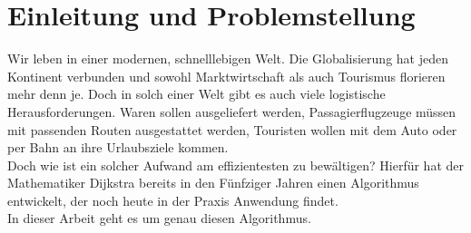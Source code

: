 \chapter{Einleitung und Problemstellung}

Wir leben in einer modernen, schnelllebigen Welt. Die Globalisierung hat jeden Kontinent verbunden und sowohl Marktwirtschaft als auch Tourismus florieren mehr denn je. 
Doch in solch einer Welt gibt es auch viele logistische Herausforderungen. Waren sollen ausgeliefert werden, Passagierflugzeuge müssen mit passenden Routen ausgestattet werden, Touristen wollen mit dem Auto oder per Bahn an ihre Urlaubsziele kommen. \\
Doch wie ist ein solcher Aufwand am effizientesten zu bewältigen? 
Hierfür hat der Mathematiker Dijkstra bereits in den Fünfziger Jahren einen Algorithmus entwickelt, der noch heute in der Praxis Anwendung findet. \\
In dieser Arbeit geht es um genau diesen Algorithmus. 
